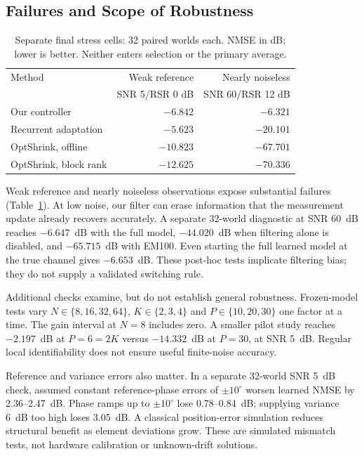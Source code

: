 \documentclass[10pt,journal,letterpaper]{IEEEtran}
\begin{document}
\subsection{Failures and Scope of Robustness}
\begin{table}[!t]
\caption{Separate final stress cells: 32 paired worlds each. NMSE in dB; lower is better. Neither enters selection or the primary average.}
\label{tab:stress}\centering\footnotesize\setlength{\tabcolsep}{4pt}
\begin{tabular}{@{}lrr@{}}\toprule
Method & Weak reference & Nearly noiseless\\
 & SNR 5/RSR 0 dB & SNR 60/RSR 12 dB\\\midrule
Our controller & $-6.842$ & $-6.321$\\
Recurrent adaptation & $-5.623$ & $-20.101$\\
OptShrink, offline & $-10.823$ & $-67.701$\\
OptShrink, block rank & $-12.625$ & $-70.336$\\\bottomrule
\end{tabular}
\end{table}
Weak reference and nearly noiseless observations expose substantial failures (Table~\ref{tab:stress}). At low noise, our filter can erase information that the measurement update already recovers accurately. A separate 32-world diagnostic at SNR 60~dB reaches $-6.647$~dB with the full model, $-44.020$~dB when filtering alone is disabled, and $-65.715$~dB with EM100. Even starting the full learned model at the true channel gives $-6.653$~dB. These post-hoc tests implicate filtering bias; they do not supply a validated switching rule.

Additional checks examine, but do not establish general robustness. Frozen-model tests vary $N\in\{8,16,32,64\}$, $K\in\{2,3,4\}$ and $P\in\{10,20,30\}$ one factor at a time. The gain interval at $N=8$ includes zero. A smaller pilot study reaches $-2.197$~dB at $P=6=2K$ versus $-14.332$~dB at $P=30$, at SNR 5~dB. Regular local identifiability does not ensure useful finite-noise accuracy.

Reference and variance errors also matter. In a separate 32-world SNR 5~dB check, assumed constant reference-phase errors of $\pm10^\circ$ worsen learned NMSE by 2.36--2.47~dB. Phase ramps up to $\pm10^\circ$ lose 0.78--0.84~dB; supplying variance 6~dB too high loses 3.05~dB. A classical position-error simulation reduces structural benefit as element deviations grow. These are simulated mismatch tests, not hardware calibration or unknown-drift solutions.
\end{document}
